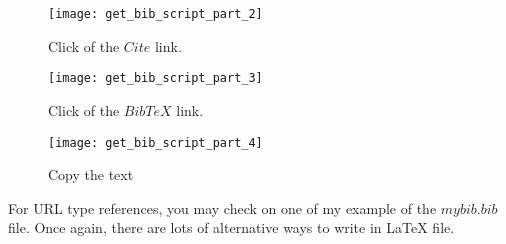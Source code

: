 \begin{figure}[H]
\centering
\texttt{[image: get\_bib\_script\_part\_2]}
\caption{Click of the $Cite$ link.}
\label{fig:fig3_2}
\end{figure}

\begin{figure}[H]
\centering
\texttt{[image: get\_bib\_script\_part\_3]}
\caption{Click of the $BibTeX$ link.}
\label{fig:fig3_3}
\end{figure}

\begin{figure}[H]
\centering
\texttt{[image: get\_bib\_script\_part\_4]}
\caption{Copy the text}
\label{fig:fig3_4}
\end{figure}

For URL type references, you may check on one of my example of the $mybib.bib$ file. Once again, there are lots of alternative ways to write in LaTeX file. 